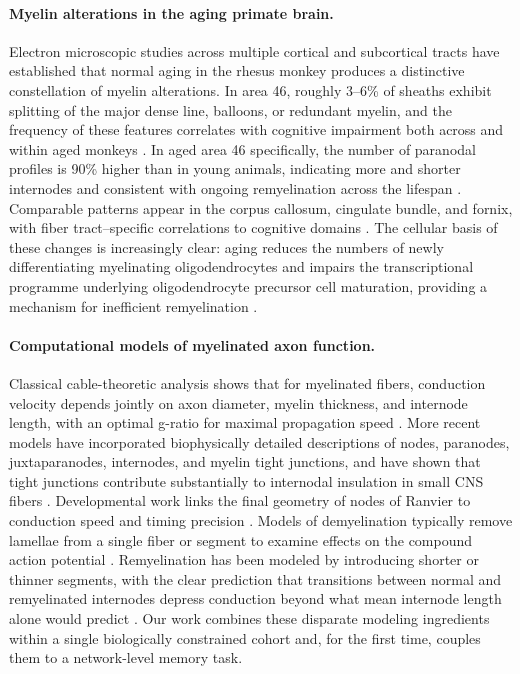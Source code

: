 \paragraph{Myelin alterations in the aging primate brain.}
Electron microscopic studies across multiple cortical and subcortical tracts have established that normal aging in the rhesus monkey produces a distinctive constellation of myelin alterations. In area 46, roughly 3--6\% of sheaths exhibit splitting of the major dense line, balloons, or redundant myelin, and the frequency of these features correlates with cognitive impairment both across and within aged monkeys \citep{peters2002aging}. In aged area 46 specifically, the number of paranodal profiles is 90\% higher than in young animals, indicating more and shorter internodes and consistent with ongoing remyelination across the lifespan \citep{peters2003remyelination}. Comparable patterns appear in the corpus callosum, cingulate bundle, and fornix, with fiber tract--specific correlations to cognitive domains \citep{bowley2010cingulate,peters2010fornix}. The cellular basis of these changes is increasingly clear: aging reduces the numbers of newly differentiating myelinating oligodendrocytes and impairs the transcriptional programme underlying oligodendrocyte precursor cell maturation, providing a mechanism for inefficient remyelination \citep{dimovasili2022oligodendrocyte,go2020vesicles}.

\paragraph{Computational models of myelinated axon function.}
Classical cable-theoretic analysis shows that for myelinated fibers, conduction velocity depends jointly on axon diameter, myelin thickness, and internode length, with an optimal g-ratio for maximal propagation speed \citep{waxman1980determinants}. More recent models have incorporated biophysically detailed descriptions of nodes, paranodes, juxtaparanodes, internodes, and myelin tight junctions, and have shown that tight junctions contribute substantially to internodal insulation in small CNS fibers \citep{devaux2008tight}. Developmental work links the final geometry of nodes of Ranvier to conduction speed and timing precision \citep{smith2024nodal}. Models of demyelination typically remove lamellae from a single fiber or segment to examine effects on the compound action potential \citep{stephanova2003extracellular,coggan2015demyelination,naud2019demyelination}. Remyelination has been modeled by introducing shorter or thinner segments, with the clear prediction that transitions between normal and remyelinated internodes depress conduction beyond what mean internode length alone would predict \citep{scurfield2018internodal,powers2012remyelination,lasiene2008partial}. Our work combines these disparate modeling ingredients within a single biologically constrained cohort and, for the first time, couples them to a network-level memory task.

